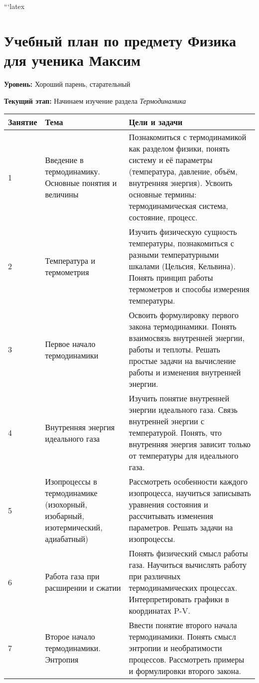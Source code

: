 ```latex
\section*{Учебный план по предмету \textbf{Физика} для ученика Максим}

\textbf{Уровень:} Хороший парень, старательный

\textbf{Текущий этап:} Начинаем изучение раздела \textit{Термодинамика}

\vspace{0.5cm}

\begin{tabular}{|p{3cm}|p{7cm}|p{5cm}|}
\hline
\textbf{Занятие} & \textbf{Тема} & \textbf{Цели и задачи} \\
\hline
1 & Введение в термодинамику. Основные понятия и величины & Познакомиться с термодинамикой как разделом физики, понять систему и её параметры (температура, давление, объём, внутренняя энергия). Усвоить основные термины: термодинамическая система, состояние, процесс. \\
\hline
2 & Температура и термометрия & Изучить физическую сущность температуры, познакомиться с разными температурными шкалами (Цельсия, Кельвина). Понять принцип работы термометров и способы измерения температуры. \\
\hline
3 & Первое начало термодинамики & Освоить формулировку первого закона термодинамики. Понять взаимосвязь внутренней энергии, работы и теплоты. Решать простые задачи на вычисление работы и изменения внутренней энергии. \\
\hline
4 & Внутренняя энергия идеального газа & Изучить понятие внутренней энергии идеального газа. Связь внутренней энергии с температурой. Понять, что внутренняя энергия зависит только от температуры для идеального газа. \\
\hline
5 & Изопроцессы в термодинамике (изохорный, изобарный, изотермический, адиабатный) & Рассмотреть особенности каждого изопроцесса, научиться записывать уравнения состояния и рассчитывать изменения параметров. Решать задачи на изопроцессы. \\
\hline
6 & Работа газа при расширении и сжатии & Понять физический смысл работы газа. Научиться вычислять работу при различных термодинамических процессах. Интерпретировать графики в координатах P-V. \\
\hline
7 & Второе начало термодинамики. Энтропия & Ввести понятие второго начала термодинамики. Понять смысл энтропии и необратимости процессов. Рассмотреть примеры и формулировки второго закона. \\

\end{tabular}
